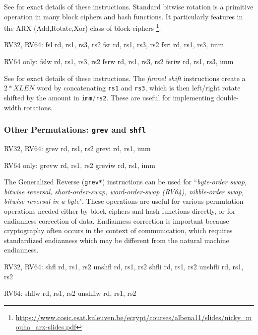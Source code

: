 See \cite[Section 3.1.1]{riscv:bitmanip:draft} for exact details of
these instructions.
Standard bitwise rotation is a primitive operation in many block ciphers and
hash functions.
It particularly features in the ARX (Add,Rotate,Xor) class of
block ciphers
\footnote{\url{https://www.cosic.esat.kuleuven.be/ecrypt/courses/albena11/slides/nicky_mouha_arx-slides.pdf}}.

\begin{isa}
RV32, RV64:
    fsl   rd, rs1, rs3, rs2
    fsr   rd, rs1, rs3, rs2
    fsri  rd, rs1, rs3, imm

RV64 only:
    fslw  rd, rs1, rs3, rs2
    fsrw  rd, rs1, rs3, rs2
    fsriw rd, rs1, rs3, imm
\end{isa}

See \cite[Section 2.9.3]{riscv:bitmanip:draft} for exact details of
these instructions.
The {\em funnel shift} instructions create a $2*XLEN$ word by
concatenating {\tt rs1} and {\tt rs3}, which is then
left/right rotate shifted by the amount in {\tt imm}/{\tt rs2}.
These are useful for implementing double-width rotations.



\subsubsection{Other Permutations: {\tt grev} and {\tt shfl}}

\begin{isa}
RV32, RV64:
    grev rd, rs1, rs2
    grevi rd, rs1, imm

RV64 only:
    grevw rd, rs1, rs2
    greviw rd, rs1, imm
\end{isa}

The Generalized Reverse ({\tt grev*}) instructions can be used for 
``{\em byte-order swap, bitwise reversal, short-order-swap,
word-order-swap (RV64), nibble-order swap, bitwise reversal in a byte}".
These operations are useful for various permutation operations
needed either by block ciphers and hash-functions directly, or for
endianness correction of data.
Endianness correction is important because
cryptography often occurs in the context of communication, which requires
standardized endianness which may be different from the natural machine
endianness.


\begin{isa}
RV32, RV64:
    shfl    rd, rs1, rs2
    unshfl  rd, rs1, rs2
    shfli   rd, rs1, rs2
    unshfli rd, rs1, rs2

RV64:
    shflw   rd, rs1, rs2
    unshflw rd, rs1, rs2
\end{isa}


